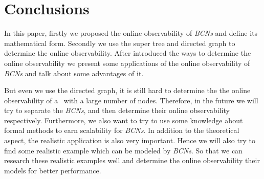 \section{Conclusions}
\label{sec:con}
In this paper, firstly we proposed the online observability of {\em BCNs} and define its mathematical form. Secondly we use the super tree and directed graph to determine the online observability. After introduced the ways to determine the online observability we present some applications of the online observability of {\em BCNs} and talk about some advantages of it. %

But even we use the directed graph, it is still hard to determine the  the online observability of a \BCN\ with a large number of nodes. Therefore, in the future we will try to separate the {\em BCNs}, and then determine their online observability respectively. Furthermore, we also want to try to use some knowledge about formal methods to earn scalability for {\em BCNs}. In addition to the theoretical aspect, the realistic application is also very important. Hence we will also try to find some realistic example which can be modeled by {\em BCNs}. So that we can research these realistic examples well and determine the online observability their models for better performance.